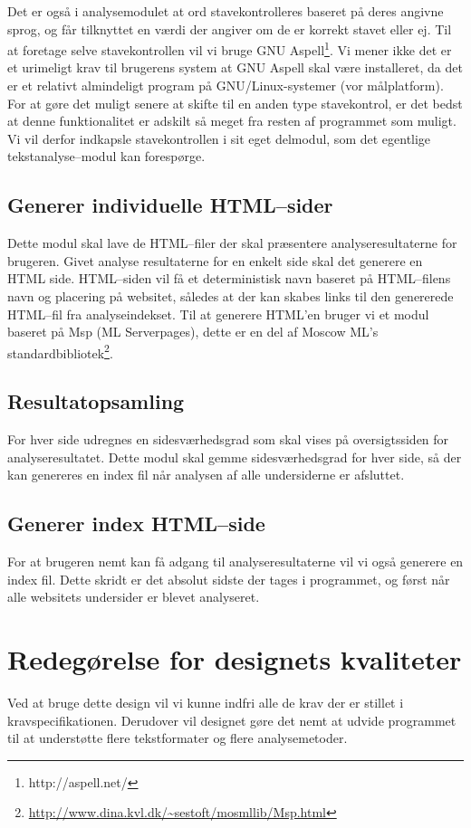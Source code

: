\documentclass[a4paper,oneside,article]{memoir}
\begin{document}
Det er også i analysemodulet at ord stavekontrolleres baseret på deres
angivne sprog, og får tilknyttet en værdi der angiver om de er korrekt
stavet eller ej. Til at foretage selve stavekontrollen vil vi bruge
GNU Aspell\footnote{http://aspell.net/}. Vi mener ikke det er et
urimeligt krav til brugerens system at GNU Aspell skal være
installeret, da det er et relativt almindeligt program på
GNU/Linux-systemer (vor målplatform). For at gøre det muligt senere at
skifte til en anden type stavekontrol, er det bedst at denne
funktionalitet er adskilt så meget fra resten af programmet som
muligt. Vi vil derfor indkapsle stavekontrollen i sit eget delmodul,
som det egentlige tekstanalyse--modul kan forespørge.

\subsection{Generer individuelle HTML--sider}
Dette modul skal lave de HTML--filer der skal præsentere
analyseresultaterne for brugeren. Givet analyse resultaterne for en
enkelt side skal det generere en HTML side. HTML--siden vil få et
deterministisk navn baseret på HTML--filens navn og placering på
websitet, således at der kan skabes links til den genererede HTML--fil
fra analyseindekset. Til at generere HTML'en bruger vi et modul
baseret på Msp (ML Serverpages), dette er en del af Moscow ML's
standardbibliotek\footnote{\url{http://www.dina.kvl.dk/~sestoft/mosmllib/Msp.html}}.

\subsection{Resultatopsamling}
For hver side udregnes en sidesværhedsgrad som skal vises på
oversigtssiden for analyseresultatet. Dette modul skal gemme
sidesværhedsgrad for hver side, så der kan genereres en index fil når
analysen af alle undersiderne er afsluttet.

\subsection{Generer index HTML--side}
For at brugeren nemt kan få adgang til analyseresultaterne vil vi også
generere en index fil. Dette skridt er det absolut sidste der tages i
programmet, og først når alle websitets undersider er blevet
analyseret.

\section{Redegørelse for designets kvaliteter}
Ved at bruge dette design vil vi kunne indfri alle de krav der er
stillet i kravspecifikationen. Derudover vil designet gøre det nemt at
udvide programmet til at understøtte flere tekstformater og flere
analysemetoder.
\end{document}
